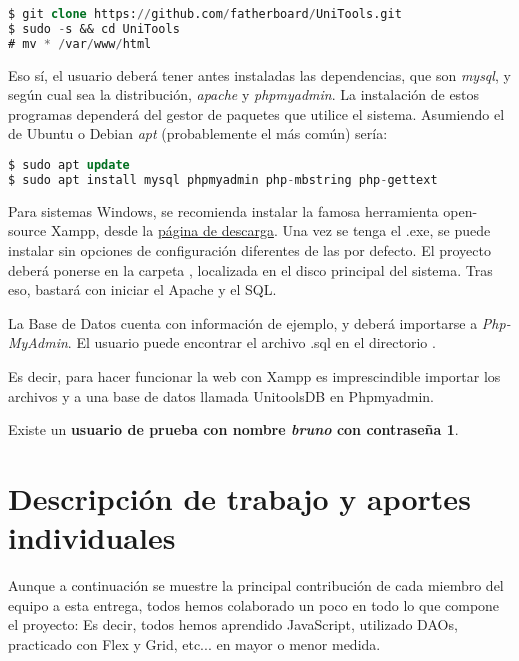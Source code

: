 \documentclass[12pt]{report}
\begin{document}
\begin{lstlisting}[language=SQL]
$ git clone https://github.com/fatherboard/UniTools.git
$ sudo -s && cd UniTools
# mv * /var/www/html
\end{lstlisting}
Eso sí, el usuario deberá tener antes instaladas las dependencias, que son \textit{mysql}, y según cual sea la distribución, \textit{apache} y \textit{phpmyadmin}. La instalación de estos programas dependerá del gestor de paquetes que utilice el sistema. Asumiendo el de Ubuntu o Debian \textit{apt} (probablemente el más común) sería:
\newline
\begin{lstlisting}[language=SQL]
$ sudo apt update
$ sudo apt install mysql phpmyadmin php-mbstring php-gettext
\end{lstlisting}
Para sistemas Windows, se recomienda instalar la famosa herramienta open-source Xampp, desde la \hyperlink{https://www.apachefriends.org/download.html}{página de descarga}. Una vez se tenga el .exe, se puede instalar sin opciones de configuración diferentes de las por defecto. El proyecto deberá ponerse en la carpeta , localizada en el disco principal del sistema. Tras eso, bastará con iniciar el Apache y el SQL.

La Base de Datos cuenta con información de ejemplo, y deberá importarse a \textit{Php-MyAdmin}. El usuario puede encontrar el archivo .sql en el directorio .

Es decir, para hacer funcionar la web con Xampp es imprescindible importar los archivos  y  a una base de datos llamada UnitoolsDB en Phpmyadmin.

Existe un \textbf{usuario de prueba con nombre \textit{bruno} con contraseña 1}.
\newpage

\section{Descripción de trabajo y aportes individuales}

Aunque a continuación se muestre la principal contribución de cada miembro del equipo a esta entrega, todos hemos colaborado un poco en todo lo que compone el proyecto: Es decir, todos hemos aprendido JavaScript, utilizado DAOs, practicado con Flex y Grid, etc... en mayor o menor medida.
\end{document}
